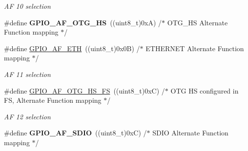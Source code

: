 \begin{DoxyCompactItemize}
\begin{DoxyCompactList}\small\item\em AF 10 selection ~\newline
 \end{DoxyCompactList}\item 
\mbox{\label{group___g_p_i_o___alternat__function__selection__define_gaa92d928ec3d83bfef06877092178960a}} 
\#define {\bfseries G\+P\+I\+O\+\_\+\+A\+F\+\_\+\+O\+T\+G\+\_\+\+HS}~((uint8\+\_\+t)0x\+A)  /$\ast$ O\+T\+G\+\_\+\+H\+S Alternate Function mapping $\ast$/
\item 
\mbox{\label{group___g_p_i_o___alternat__function__selection__define_ga26cf3f30fe5154bd461b27fab58e45e2}} 
\#define \mbox{\hyperlink{group___g_p_i_o___alternat__function__selection__define_ga26cf3f30fe5154bd461b27fab58e45e2}{G\+P\+I\+O\+\_\+\+A\+F\+\_\+\+E\+TH}}~((uint8\+\_\+t)0x0\+B)  /$\ast$ E\+T\+H\+E\+R\+N\+E\+T Alternate Function mapping $\ast$/
\begin{DoxyCompactList}\small\item\em AF 11 selection ~\newline
 \end{DoxyCompactList}\item 
\mbox{\label{group___g_p_i_o___alternat__function__selection__define_ga5f30e17f7328fa05e6dd8b799ae5e6ee}} 
\#define \mbox{\hyperlink{group___g_p_i_o___alternat__function__selection__define_ga5f30e17f7328fa05e6dd8b799ae5e6ee}{G\+P\+I\+O\+\_\+\+A\+F\+\_\+\+O\+T\+G\+\_\+\+H\+S\+\_\+\+FS}}~((uint8\+\_\+t)0x\+C)  /$\ast$ O\+T\+G H\+S configured in F\+S, Alternate Function mapping $\ast$/
\begin{DoxyCompactList}\small\item\em AF 12 selection ~\newline
 \end{DoxyCompactList}\item 
\mbox{\label{group___g_p_i_o___alternat__function__selection__define_ga0ae9928f85fc99947659994eb025cc2b}} 
\#define {\bfseries G\+P\+I\+O\+\_\+\+A\+F\+\_\+\+S\+D\+IO}~((uint8\+\_\+t)0x\+C)  /$\ast$ S\+D\+I\+O Alternate Function mapping                     $\ast$/

\end{DoxyCompactItemize}
